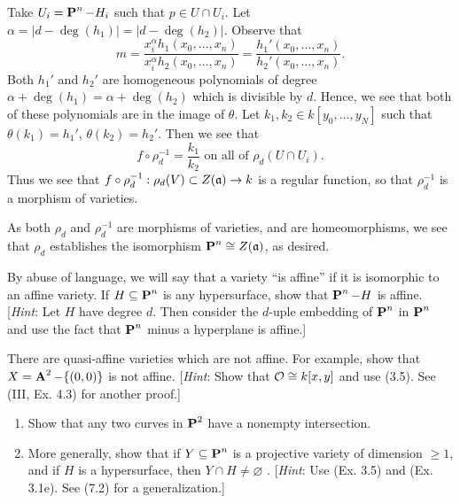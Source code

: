 \documentclass[10pt]{amsart}
\begin{document}
\begin{solution}
\begin{luke}
\begin{itemize}[itemsep=2pt, label={\textbullet}]
            Take $U_i = \pp^n - H_i$ such that $p \in U \cap U_i$. Let 
            $\alpha = |d - \deg(h_1)| = |d - \deg(h_2)|$.  
            Observe that 
            \[
                m = \frac{x_i^{\alpha}h_1(x_0, \dots, x_n)}{x_i^{\alpha}h_2(x_0, \dots, x_n)} = \frac{h_1'(x_0, \dots, x_n)}{h_2'(x_0, \dots, x_n)}.
            \]
            Both $h_1'$ and $h_2'$ are homogeneous polynomials 
            of degree $\alpha + \deg(h_1) = \alpha + \deg(h_2)$ which is divisible by $d$.
            Hence, we see that both of these polynomials are in the image of $\theta$. 
            Let $k_1, k_2 \in k[y_0, \dots, y_N]$ such that $\theta(k_1) = h_1'$, $\theta(k_2) = h_2'$.
            Then we see that 
            \[
                f \circ \rho_d^{-1} = \frac{k_1}{k_2} \text{ on all of } \rho_d(U \cap U_i).
            \]
            Thus we see that $f \circ \rho_d^{-1}: \rho_d(V) \subset Z(\idl{a}) \to k$ is a regular function, so that 
            $\rho_d^{-1}$ is a morphism of varieties. 
        \end{itemize}
        As both $\rho_d$ and $\rho_d^{-1}$ are morphisms 
        of varieties, and are homeomorphisms, we see that $\rho_d$ establishes the isomorphism 
        $\pp^n \cong Z(\idl{a})$, as desired. 
    \end{luke}
\end{solution}

\begin{exercise}[3.5]
    By abuse of language, we will say that a variety ``is affine'' if it is 
    isomorphic to an affine variety. If $H \subseteq \pp^n$ is any hypersurface, 
    show that $\pp^n - H$ is affine. 
    [\emph{Hint}: Let $H$ have degree $d$. Then consider the $d$-uple 
    embedding of $\pp^n$ in $\pp^n$ and use the fact that $\pp^n$ minus 
    a hyperplane is affine.]
\end{exercise}


\begin{exercise}[3.6]
    There are quasi-affine varieties which are not affine. For example, show that 
    $X = \aa^2 - \{(0,0)\}$ is not affine. [\emph{Hint}: Show 
    that $\cO \cong k[x,y]$
    and use (3.5). See (III, Ex. 4.3) for another proof.]
\end{exercise}


\begin{exercise}[3.7]  
    \begin{enumerate}[itemsep=1pt]
        \item Show that any two curves in $\pp^2$ have a nonempty intersection.
        \item More generally, show that if $Y \subseteq \pp^n$ is a projective variety of 
        dimension $\ge 1$, and if $H$ is a hypersurface, then $Y \cap H \ne \varnothing$ . 
        [\emph{Hint}: Use (Ex. 3.5) and (Ex. 3.1e). See (7.2) for a generalization.]
    \end{enumerate}
\end{exercise}
\end{document}
